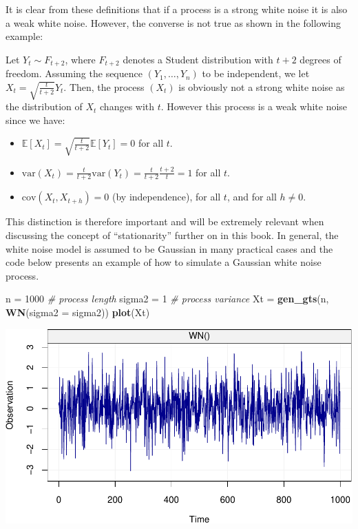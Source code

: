 \documentclass[]{book}
\newenvironment{Shaded}{\begin{snugshade}}{\end{snugshade}}
\newcommand{\KeywordTok}[1]{\textcolor[rgb]{0.13,0.29,0.53}{\textbf{#1}}}
\newcommand{\DataTypeTok}[1]{\textcolor[rgb]{0.13,0.29,0.53}{#1}}
\newcommand{\DecValTok}[1]{\textcolor[rgb]{0.00,0.00,0.81}{#1}}
\newcommand{\StringTok}[1]{\textcolor[rgb]{0.31,0.60,0.02}{#1}}
\newcommand{\CommentTok}[1]{\textcolor[rgb]{0.56,0.35,0.01}{\textit{#1}}}
\newcommand{\NormalTok}[1]{#1}
\providecommand{\tightlist}{%
  \setlength{\itemsep}{0pt}\setlength{\parskip}{0pt}}
\theoremstyle{definition}
\theoremstyle{definition}
\theoremstyle{definition}
\theoremstyle{remark}
\let\BeginKnitrBlock\begin \let\EndKnitrBlock\end
\begin{document}
It is clear from these definitions that if a process is a strong white
noise it is also a weak white noise. However, the converse is not true
as shown in the following example:

\BeginKnitrBlock{example}
\protect\hypertarget{exm:weaknotstrong}{}{\label{exm:weaknotstrong} } Let
\(Y_t \mathop \sim F_{t+2}\), where \(F_{t+2}\) denotes a Student
distribution with \(t+2\) degrees of freedom. Assuming the sequence
\((Y_1, \ldots, Y_n)\) to be independent, we let
\(X_t = \sqrt{\frac{t}{t+2}} Y_t\). Then, the process \((X_t)\) is
obviously not a strong white noise as the distribution of \(X_t\)
changes with \(t\). However this process is a weak white noise since we
have:

\begin{itemize}
\tightlist
\item
  \(\mathbb{E}[X_t] = \sqrt{\frac{t}{t+2}} \mathbb{E}[Y_t] = 0\) for all
  \(t\).
\item
  \(\text{var}(X_t) = \frac{t}{t+2} \text{var}(Y_t) = \frac{t}{t+2} \frac{t+2}{t} = 1\)
  for all \(t\).
\item
  \(\text{cov}(X_t, X_{t+h}) = 0\) (by independence), for all \(t\), and
  for all \(h \neq 0\).
\end{itemize}
\EndKnitrBlock{example}

This distinction is therefore important and will be extremely relevant
when discussing the concept of ``stationarity'' further on in this book.
In general, the white noise model is assumed to be Gaussian in many
practical cases and the code below presents an example of how to
simulate a Gaussian white noise process.

\begin{Shaded}
\begin{Highlighting}[]
\NormalTok{n =}\StringTok{ }\DecValTok{1000}                               \CommentTok{# process length}
\NormalTok{sigma2 =}\StringTok{ }\DecValTok{1}                             \CommentTok{# process variance}
\NormalTok{Xt =}\StringTok{ }\KeywordTok{gen_gts}\NormalTok{(n, }\KeywordTok{WN}\NormalTok{(}\DataTypeTok{sigma2 =}\NormalTok{ sigma2))}
\KeywordTok{plot}\NormalTok{(Xt)}
\end{Highlighting}
\end{Shaded}

\includegraphics{ts_files/figure-latex/example_WN-1.pdf}
\end{document}
